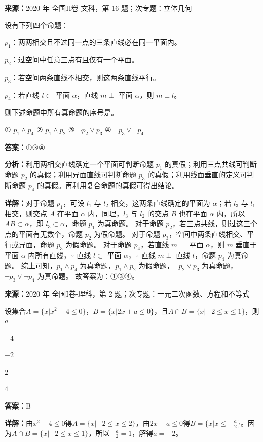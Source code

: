 \begin{question}[points=5]
\textbf{来源：}2020 年 全国II卷-文科，第 16 题；次专题：立体几何\par
设有下列四个命题：

$p_1$：两两相交且不过同一点的三条直线必在同一平面内。

$p_2$：过空间中任意三点有且仅有一个平面。

$p_3$：若空间两条直线不相交，则这两条直线平行。

$p_4$：若直线 $l \subset$ 平面 $\alpha$，直线 $m\perp$ 平面 $\alpha$，则 $m\perp l$。

则下述命题中所有真命题的序号是。

① $p_1 \land p_4$ ② $p_1 \land p_2$ ③ $\lnot p_2 \lor p_3$ ④ $\lnot p_3 \lor \lnot p_4$
\fillin[{$①③④$}]
\begin{solution}
\textbf{答案：}$①③④$

\textbf{分析：}利用两相交直线确定一个平面可判断命题 $p_1$ 的真假；利用三点共线可判断命题 $p_2$ 的真假；利用异面直线可判断命题 $p_3$ 的真假；利用线面垂直的定义可判断命题 $p_4$ 的真假。再利用复合命题的真假可得出结论。

\textbf{详解：}对于命题 $p_1$，可设 $l_1$ 与 $l_2$ 相交，这两条直线确定的平面为 $\alpha$；若 $l_3$ 与 $l_1$ 相交，则交点 $A$ 在平面 $\alpha$ 内，同理，$l_3$ 与 $l_2$ 的交点 $B$ 也在平面 $\alpha$ 内，所以 $AB\subset \alpha$，即 $l_3\subset \alpha$，命题 $p_1$ 为真命题。
对于命题 $p_2$，若三点共线，则过这三个点的平面有无数个，命题 $p_2$ 为假命题。
对于命题 $p_3$，空间中两条直线相交、平行或异面，命题 $p_3$ 为假命题。
对于命题 $p_4$，若直线 $m\perp$ 平面 $\alpha$，则 $m$ 垂直于平面 $\alpha$ 内所有直线，$\because$ 直线 $l\subset$ 平面 $\alpha$，$\therefore$ 直线 $m\perp$ 直线 $l$，命题 $p_4$ 为真命题。
综上可知，$p_1\land p_4$ 为真命题，$p_1\land p_2$ 为假命题，$\lnot p_2\lor p_3$ 为真命题，$\lnot p_3\lor \lnot p_4$ 为真命题。
故答案为：①③④。
\end{solution}
\end{question}

\begin{question}[points=5]
\textbf{来源：}2020 年 全国I卷-理科，第 2 题；次专题：一元二次函数、方程和不等式\par
设集合$A=\{x|x^2-4\leq 0\}$，$B=\{x|2x+a\leq 0\}$，且$A\cap B=\{x|-2\leq x\leq 1\}$，则$a=$
\begin{choices}
  \item $-4$
  \item $-2$
  \item $2$
  \item $4$
\end{choices}
\begin{solution}
\textbf{答案：}B

\textbf{详解：}由$x^2-4\leq 0$得$A=\{x|-2\leq x\leq 2\}$，由$2x+a\leq 0$得$B=\{x|x\leq -\frac{a}{2}\}$。因为$A\cap B=\{x|-2\leq x\leq 1\}$，所以$-\frac{a}{2}=1$，解得$a=-2$。
\end{solution}
\end{question}

